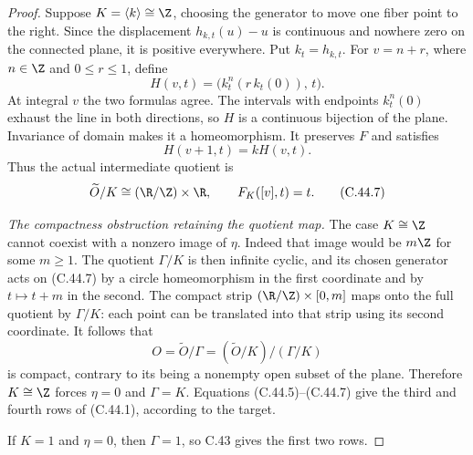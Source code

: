 \begin{proof}
Suppose $K=\langle k\rangle\cong\Z$,
choosing the generator to move one
fiber point to the right.
Since the displacement
$h_{k,t}(u)-u$ is continuous and
nowhere zero on the connected plane,
it is positive everywhere.
Put $k_t=h_{k,t}$.
For $v=n+r$, where $n\in\Z$ and
$0\leq r\leq1$, define
\[
 H(v,t)=\bigl(k_t^n(r\,k_t(0)),\,t\bigr).
                                                               \tag{C.44.5}
\]
At integral $v$ the two formulas
agree. The intervals with endpoints
$k_t^n(0)$ exhaust the line in both
directions, so $H$ is a continuous
bijection of the plane. Invariance
of domain makes it a homeomorphism.
It preserves $F$ and satisfies
\[
                        H(v+1,t)=kH(v,t).
                                                               \tag{C.44.6}
\]
Thus the actual intermediate quotient
is
\[
 \widetilde O/K\cong(\R/\Z)\times\R,
 \qquad F_K([v],t)=t.                                  \tag{C.44.7}
\]

\emph{The compactness obstruction retaining the quotient map.}
The case $K\cong\Z$ cannot coexist
with a nonzero image of $\eta$.
Indeed that image would be $m\Z$
for some $m\geq1$. The quotient
$\Gamma/K$ is then infinite cyclic,
and its chosen generator acts on
(C.44.7) by a circle homeomorphism
in the first coordinate and by
$t\mapsto t+m$ in the second.
The compact strip
$(\R/\Z)\times[0,m]$ maps onto the
full quotient by $\Gamma/K$:
each point can be translated into
that strip using its second coordinate.
It follows that
\[
     O=\widetilde O/\Gamma
       =(\widetilde O/K)/(\Gamma/K)
\]
is compact, contrary to its being
a nonempty open subset of the plane.
Therefore $K\cong\Z$ forces
$\eta=0$ and $\Gamma=K$.
Equations (C.44.5)--(C.44.7) give
the third and fourth rows of
(C.44.1), according to the target.

If $K=1$ and $\eta=0$, then
$\Gamma=1$, so C.43 gives the
first two rows.


\end{proof}
